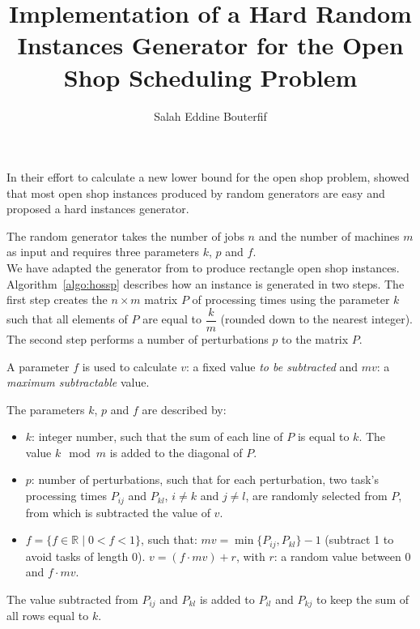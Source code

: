 \documentclass[11pt]{article}
\title{Implementation of a Hard Random Instances Generator for the Open Shop Scheduling Problem}   %
\author{Salah Eddine Bouterfif}         %
\begin{document}
\flushbottom
\maketitle
\thispagestyle{empty}

In their effort to calculate a new lower bound for the open shop problem, \cite{gp1999} showed that most open shop instances produced by random generators are easy and proposed a hard instances generator.\par

The random generator takes the number of jobs $n$ and the number of machines $m$ as input and requires three parameters $k$, $p$ and $f$.\\

We have adapted the generator from \cite{gp1999} to produce rectangle open shop instances. Algorithm~\ref{algo:hossp} describes how an instance is generated in two steps. The first step creates the $ n \times m $ matrix $P$ of processing times using the parameter $k$ such that all elements of $P$ are equal to $\dfrac{k}{m}$ (rounded down to the nearest integer). The second step performs a number of perturbations $p$ to the matrix $P$.\par

A parameter $f$ is used to calculate $v$: a fixed value \textit{to be subtracted} and $mv$: a \textit{maximum subtractable} value. 

The parameters $k$, $p$ and $f$ are described by:

\begin{itemize}
    \item $k$: integer number, such that the sum of each line of $P$ is equal to $k$. The value $k \mod m$ is added to the diagonal of $P$. 
    
    \item $p$: number of perturbations, such that for each perturbation, two task's processing times $P_{ij}$ and $ P_{kl}$, $i \neq k $ and $j \neq l$, are randomly selected from $P$, from which is subtracted the value of $v$.
    
    \item $f=\{f \in \mathbb{R} \mid 0<f<1\}$, such that:
    \subitem $mv =  \min\{P_{ij},P_{kl}\}-1$ (subtract 1 to avoid tasks of length 0).      
    \subitem $v = (f \cdot mv) + r $, with $r$: a random value between $0$ and $f \cdot mv$. 
\end{itemize}

The value subtracted from $P_{ij}$ and $P_{kl}$ is added to $P_{il}$ and $P_{kj}$ to keep the sum of all rows equal to $k$.
\end{document}

